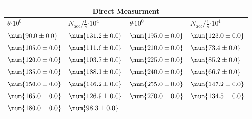 \begin{tabular}{|p{}|p{}||p{}|p{}|}
\hline
\multicolumn{4}{|c|}{Direct Measurment}\\
\hline
$\theta$$\cdot 10^{0}$&$N_\text{acc}/\frac{1}{s}$$\cdot 10^{4}$&$\theta$$\cdot 10^{0}$&$N_\text{acc}/\frac{1}{s}$$\cdot 10^{4}$\\
\hline
$\num{90.0\pm 0.0}$&$\num{131.2\pm 0.0}$&$\num{195.0\pm 0.0}$&$\num{123.0\pm 0.0}$\\
$\num{105.0\pm 0.0}$&$\num{111.6\pm 0.0}$&$\num{210.0\pm 0.0}$&$\num{73.4\pm 0.0}$\\
$\num{120.0\pm 0.0}$&$\num{103.7\pm 0.0}$&$\num{225.0\pm 0.0}$&$\num{85.2\pm 0.0}$\\
$\num{135.0\pm 0.0}$&$\num{188.1\pm 0.0}$&$\num{240.0\pm 0.0}$&$\num{66.7\pm 0.0}$\\
$\num{150.0\pm 0.0}$&$\num{146.2\pm 0.0}$&$\num{255.0\pm 0.0}$&$\num{147.2\pm 0.0}$\\
$\num{165.0\pm 0.0}$&$\num{126.9\pm 0.0}$&$\num{270.0\pm 0.0}$&$\num{134.5\pm 0.0}$\\
$\num{180.0\pm 0.0}$&$\num{98.3\pm 0.0}$&&\\
\hline
\end{tabular}
